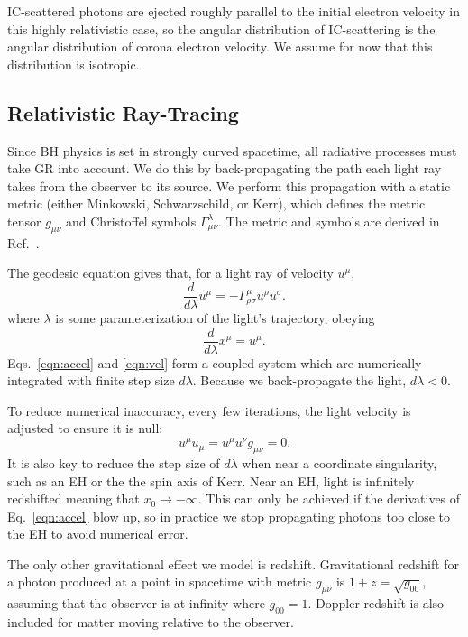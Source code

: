 \documentclass[twocolumn,twocolappendix]{aastex631}
\begin{document}
IC-scattered photons are ejected roughly parallel to the initial electron velocity in this highly relativistic case, so the angular distribution of IC-scattering is the angular distribution of corona electron velocity. We assume for now that this distribution is isotropic.



\subsection{Relativistic Ray-Tracing}

Since BH physics is set in strongly curved spacetime, all radiative processes must take GR into account. We do this by back-propagating the path each light ray takes from the observer to its source. We perform this propagation with a static metric (either Minkowski, Schwarzschild, or Kerr), which defines the metric tensor $g_{\mu \nu}$ and Christoffel symbols $\Gamma_{\mu\nu}^\lambda$. The metric and symbols are derived in Ref.~\cite{muller2009catalogue}.

The geodesic equation gives that, for a light ray of velocity $u^\mu$,
\begin{equation}
  \frac{d}{d\lambda}u^\mu = -\Gamma^\mu_{\rho \sigma}u^\rho u^\sigma.
  \label{eqn:accel}
\end{equation}
where $\lambda$ is some parameterization of the light's trajectory, obeying 
\begin{equation}
  \frac{d}{d\lambda}x^\mu = u^\mu.
  \label{eqn:vel}
\end{equation}
Eqs.~\ref{eqn:accel} and \ref{eqn:vel} form a coupled system which are numerically integrated with finite step size $d\lambda$. Because we back-propagate the light, $d\lambda < 0$. 

To reduce numerical inaccuracy, every few iterations, the light velocity is adjusted to ensure it is null:
\begin{equation}
  u^\mu u_\mu = u^\mu u^\nu g_{\mu\nu} = 0.
\end{equation}
It is also key to reduce the step size of $d\lambda$ when near a coordinate singularity, such as an EH or the the spin axis of Kerr. Near an EH, light is infinitely redshifted meaning that $x_0 \rightarrow -\infty$. This can only be achieved if the derivatives of Eq.~\ref{eqn:accel} blow up, so in practice we stop propagating photons too close to the EH to avoid numerical error.

The only other gravitational effect we model is redshift. Gravitational redshift for a photon produced at a point in spacetime with metric $g_{\mu\nu}$ is  $1 + z = \sqrt{g_{00}}$, assuming that the observer is at infinity where $g_{00} = 1$. Doppler redshift is also included for matter moving relative to the observer.
\end{document}

